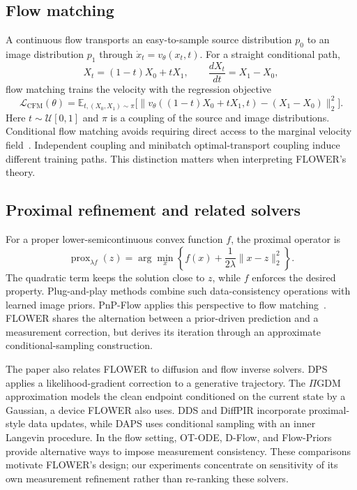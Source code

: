 \documentclass[10pt,letterpaper]{article}
\newcommand{\E}{\mathbb{E}}
\begin{document}
\subsection{Flow matching}
A continuous flow transports an easy-to-sample source distribution $p_0$ to an image distribution $p_1$ through $\dot x_t=v_\theta(x_t,t)$. For a straight conditional path,
\begin{equation}
 X_t=(1-t)X_0+tX_1,\qquad \frac{dX_t}{dt}=X_1-X_0,
 \label{eq:path}
\end{equation}
flow matching trains the velocity with the regression objective
\begin{equation}
 \mathcal L_{\mathrm{CFM}}(\theta)=
 \E_{t,(X_0,X_1)\sim\pi}
 \bigl[\|v_\theta((1-t)X_0+tX_1,t)-(X_1-X_0)\|_2^2\bigr].
 \label{eq:cfm}
\end{equation}
Here $t\sim\mathcal U[0,1]$ and $\pi$ is a coupling of the source and image distributions. Conditional flow matching avoids requiring direct access to the marginal velocity field~\cite{fm}. Independent coupling and minibatch optimal-transport coupling induce different training paths. This distinction matters when interpreting FLOWER's theory.

\subsection{Proximal refinement and related solvers}
For a proper lower-semicontinuous convex function $f$, the proximal operator is
\begin{equation}
 \operatorname{prox}_{\lambda f}(z)
 =\arg\min_x\left\{f(x)+\frac{1}{2\lambda}\|x-z\|_2^2\right\}.
 \label{eq:prox}
\end{equation}
The quadratic term keeps the solution close to $z$, while $f$ enforces the desired property. Plug-and-play methods combine such data-consistency operations with learned image priors. PnP-Flow applies this perspective to flow matching~\cite{pnpflow}. FLOWER shares the alternation between a prior-driven prediction and a measurement correction, but derives its iteration through an approximate conditional-sampling construction.

The paper also relates FLOWER to diffusion and flow inverse solvers. DPS applies a likelihood-gradient correction to a generative trajectory. The $\Pi$GDM approximation models the clean endpoint conditioned on the current state by a Gaussian, a device FLOWER also uses. DDS and DiffPIR incorporate proximal-style data updates, while DAPS uses conditional sampling with an inner Langevin procedure. In the flow setting, OT-ODE, D-Flow, and Flow-Priors provide alternative ways to impose measurement consistency. These comparisons motivate FLOWER's design; our experiments concentrate on sensitivity of its own measurement refinement rather than re-ranking these solvers.
\end{document}
